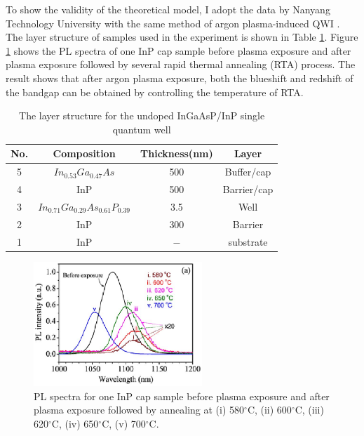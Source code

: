 To show the validity of the theoretical model, I adopt the data by Nanyang
Technology University with the same method of argon plasma-induced QWI \cite{redshift}.
The layer structure of samples used in the experiment is shown in Table \ref{RedShiftSample}.
Figure \ref{ex_redshift} shows the PL spectra of one InP cap sample before plasma exposure
and after plasma exposure followed by several rapid thermal annealing (RTA) process.
The result shows that after argon plasma exposure, both the blueshift and redshift
of the bandgap can be obtained by controlling the temperature of RTA.

\begin{table}[!t]
    \renewcommand{\arraystretch}{1.3}
    \caption{The layer structure for the undoped InGaAsP/InP single quantum well}
    \centering
    \label{RedShiftSample}
    \begin{tabular}{cccc}
        \hline
        \hline
        No. & Composition & Thickness(nm) & Layer\\
        \hline
        5 & $In_{0.53}Ga_{0.47}As$ & 500 & Buffer/cap\\
        4 & InP & 500 & Barrier/cap\\
        3 & $In_{0.71}Ga_{0.29}As_{0.61}P_{0.39}$ & 3.5 & Well\\
        2 & InP & 300 & Barrier\\
        1 & InP & $-$ & substrate\\
        \hline
        \hline
    \end{tabular}
\end{table}

\begin{figure}[!t]
    \centering
    \includegraphics[width=2.5in]{fig/exp_red}
    \caption{PL spectra for one InP cap sample before plasma exposure and after plasma
        exposure followed by annealing at (i) 580$^\circ$C, (ii) 600$^\circ$C, (iii) 620$^\circ$C,
        (iv) 650$^\circ$C, (v) 700$^\circ$C.}
    \label{ex_redshift}
\end{figure}

